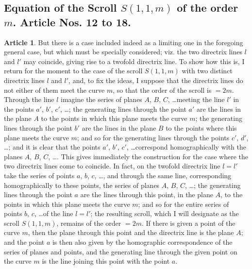 \documentclass[12pt,a4paper]{article}
\theoremstyle{definition}
\newtheorem{art}{Article}[section]
\begin{document}
\subsection*{Equation of the Scroll $S(1, 1, m)$ of the order $m$. Article Nos. 12 to 18.}

\begin{art}
But there is a case included indeed as a limiting one in the foregoing general case, but which must be specially considered; viz. the two directrix lines $l$ and $l'$ may coincide, giving rise to a twofold directrix line. To show how this is, I return for the moment to the case of the scroll $S(1, 1, m)$ with two distinct directrix lines $l$ and $l'$, and, to fix the ideas, I suppose that the directrix lines do not either of them meet the curve $m$, so that the order of the scroll is $= 2m$. Through the line $l$ imagine the series of planes $A$, $B$, $C$, \ldots meeting the line $l'$ in the points $a'$, $b'$, $c'$, \ldots; the generating lines through the point $a'$ are the lines in the plane $A$ to the points in which this plane meets the curve $m$; the generating lines through the point $b'$ are the lines in the plane $B$ to the points where this plane meets the curve $m$; and so for the generating lines through the points $c'$, $d'$, \ldots; and it is clear that the points $a'$, $b'$, $c'$, \ldots correspond homographically with the planes $A$, $B$, $C$, \ldots. This gives immediately the construction for the case where the two directrix lines come to coincide. In fact, on the twofold directrix line $l = l'$ take the series of points $a$, $b$, $c$, \ldots, and through the same line, corresponding homographically to these points, the series of planes $A$, $B$, $C$, \ldots; the generating lines through the point $a$ are the lines through this point, in the plane $A$, to the points in which this plane meets the curve $m$; and so for the entire series of points $b$, $c$, \ldots of the line $l = l'$; the resulting scroll, which I will designate as the scroll $S(1, 1, m)$, remains of the order $= 2m$. If there is given a point of the curve $m$, then the plane through this point and the directrix line is the plane $A$; and the point $a$ is then also given by the homographic correspondence of the series of planes and points, and the generating line through the given point on the curve $m$ is the line joining this point with the point $a$.
\end{art}
\end{document}
